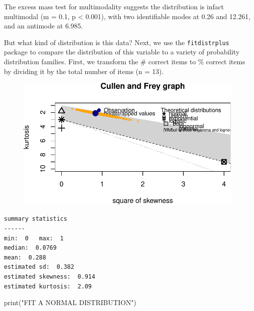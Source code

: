 \documentclass[
  letterpaper,
  DIV=11,
  numbers=noendperiod]{scrreprt}
\newenvironment{Shaded}{\begin{snugshade}}{\end{snugshade}}
\newcommand{\AttributeTok}[1]{\textcolor[rgb]{0.40,0.45,0.13}{#1}}
\newcommand{\CommentTok}[1]{\textcolor[rgb]{0.37,0.37,0.37}{#1}}
\newcommand{\ConstantTok}[1]{\textcolor[rgb]{0.56,0.35,0.01}{#1}}
\newcommand{\DecValTok}[1]{\textcolor[rgb]{0.68,0.00,0.00}{#1}}
\newcommand{\FunctionTok}[1]{\textcolor[rgb]{0.28,0.35,0.67}{#1}}
\newcommand{\NormalTok}[1]{\textcolor[rgb]{0.00,0.23,0.31}{#1}}
\newcommand{\SpecialCharTok}[1]{\textcolor[rgb]{0.37,0.37,0.37}{#1}}
\newcommand{\StringTok}[1]{\textcolor[rgb]{0.13,0.47,0.30}{#1}}
\begin{document}
The excess mass test for multimodality suggests the distribution is
infact multimodal (m = 0.1, p \textless{} 0.001), with two identifiable
modes at 0.26 and 12.261, and an antimode at 6.985.

But what kind of distribution is this data? Next, we use the
\texttt{fitdistrplus} package to compare the distribution of this
variable to a variety of probability distribution families. First, we
transform the \# correct items to \% correct items by dividing it by the
total number of items (n = 13).

\begin{Shaded}
\end{Shaded}

\begin{figure}[H]

{\centering \includegraphics{analysis/SGC3A/3_sgc3A_description_files/figure-pdf/FIT-DIST-TOTAL-ABS-1.pdf}

}

\end{figure}

\begin{verbatim}
summary statistics
------
min:  0   max:  1 
median:  0.0769 
mean:  0.288 
estimated sd:  0.382 
estimated skewness:  0.914 
estimated kurtosis:  2.09 
\end{verbatim}

\begin{Shaded}
\begin{Highlighting}[]
\FunctionTok{print}\NormalTok{(}\StringTok{"FIT A NORMAL DISTRIBUTION"}\NormalTok{)}
\end{Highlighting}
\end{Shaded}
\end{document}
